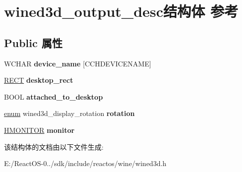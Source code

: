 \hypertarget{structwined3d__output__desc}{}\section{wined3d\+\_\+output\+\_\+desc结构体 参考}
\label{structwined3d__output__desc}
\subsection*{Public 属性}
\begin{DoxyCompactItemize}
\item 
\mbox{\label{structwined3d__output__desc_a0f421da9180200f7ddadfcbed791c859}} 
W\+C\+H\+AR {\bfseries device\+\_\+name} \mbox{[}C\+C\+H\+D\+E\+V\+I\+C\+E\+N\+A\+ME\mbox{]}
\item 
\mbox{\label{structwined3d__output__desc_a915b9b0d2962465afa032a3fe7c19017}} 
\hyperlink{structtag_r_e_c_t}{R\+E\+CT} {\bfseries desktop\+\_\+rect}
\item 
\mbox{\label{structwined3d__output__desc_afbd473d07b26ddb736c821c1a9122e5c}} 
B\+O\+OL {\bfseries attached\+\_\+to\+\_\+desktop}
\item 
\mbox{\label{structwined3d__output__desc_a1040571af350a31bee2429ae64a25f80}} 
\hyperlink{interfaceenum}{enum} wined3d\+\_\+display\+\_\+rotation {\bfseries rotation}
\item 
\mbox{\label{structwined3d__output__desc_a282eafc8080efd80a13f6d515299e42d}} 
\hyperlink{interfacevoid}{H\+M\+O\+N\+I\+T\+OR} {\bfseries monitor}
\end{DoxyCompactItemize}


该结构体的文档由以下文件生成\+:\begin{DoxyCompactItemize}
\item 
E\+:/\+React\+O\+S-\/0../sdk/include/reactos/wine/wined3d.\+h\end{DoxyCompactItemize}
